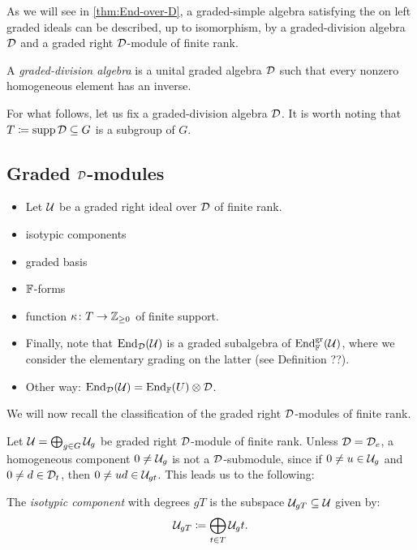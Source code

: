 As we will see in \cref{thm:End-over-D}, a graded-simple algebra satisfying the \dcc on left graded ideals can be described, up to isomorphism, by a graded-division algebra $\mathcal{D}$ and a graded right $\mathcal{D}$-module of finite rank.

\begin{defi}
    A \emph{graded-division algebra} is a unital graded algebra $\mathcal{D}$ such that every nonzero homogeneous element has an inverse.
\end{defi}

For what follows, let us fix a graded-division algebra $\mathcal{D}$.
It is worth noting that $T \coloneqq \operatorname{supp} \mathcal{D} \subseteq G$ is a subgroup of $G$. 

\subsection{Graded $\mathcal{D}$-modules}\label{sec:grd-D-modules}

\begin{itemize}
    \item Let $\mathcal U$ be a graded right ideal over $\mathcal{D}$ of finite rank. 
    \item isotypic components
    \item graded basis
    \item $\mathbb{F}$-forms
    \item function $\kappa\colon T \to \mathbb{Z}_{\geq 0}$ of finite support.
    \item Finally, note that $\operatorname{End}_{\mathcal{D}} (\mathcal U)$ is a graded subalgebra of $\operatorname{End}^{\mathrm{gr}}_{\mathbb{F}} (\mathcal U)$, where we consider the elementary grading on the latter (see Definition ??).
    \item Other way: $\operatorname{End}_{\mathcal{D}} (\mathcal U) = \operatorname{End}_{\mathbb{F}} (U) \otimes \mathcal{D}$.
\end{itemize}

We will now recall the classification of the graded right $\mathcal{D}$-modules of finite rank. 

Let $\mathcal U = \bigoplus_{g\in G} \mathcal U_g$ be graded right $\mathcal{D}$-module of finite rank. 
Unless $\mathcal{D} = \mathcal{D}_e$, a homogeneous component $0\neq \mathcal U_g$ is not a $\mathcal{D}$-submodule, since if $0\neq u \in \mathcal U_g$ and $0\neq d \in \mathcal{D}_t$, then $0\neq ud \in \mathcal U_{gt}$. 
This leads us to the following:

\begin{defi}
    The \emph{isotypic component} with degrees $gT$ is the subspace $\mathcal U_{gT} \subseteq \mathcal U$ given by:
    \[
        \mathcal U_{gT} \coloneqq \bigoplus_{t\in T} \mathcal U_gt.
    \]
\end{defi}

